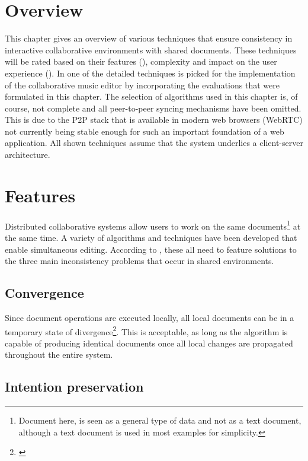 \section{Overview}

This chapter gives an overview of various techniques that ensure consistency in interactive collaborative environments with shared documents. These techniques will be rated based on their features (), complexity and impact on the user experience (). In  one of the detailed techniques is picked for the implementation of the collaborative music editor by incorporating the evaluations that were formulated in this chapter. The selection of algorithms used in this chapter is, of course, not complete and all peer-to-peer syncing mechanisms have been omitted. This is due to the P2P stack that is available in modern web browsers (WebRTC) not currently being stable enough for such an important foundation of a web application. All shown techniques assume that the system underlies a client-server architecture.

\section{Features}
\label{sync-features}

Distributed collaborative systems allow users to work on the same documents\footnote{Document here, is seen as a general type of data and not as a text document, although a text document is used in most examples for simplicity.} at the same time. A variety of algorithms and techniques have been developed that enable simultaneous editing. According to \cite{sun1998achieving}, these all need to feature solutions to the three main inconsistency problems that occur in shared environments.

\subsection{Convergence}

Since document operations are executed locally, all local documents can be in a temporary state of divergence\footnote{\cite[p. 65]{sun1998achieving}}. This is acceptable, as long as the algorithm is capable of producing identical documents once all local changes are propagated throughout the entire system.

\subsection{Intention preservation}

